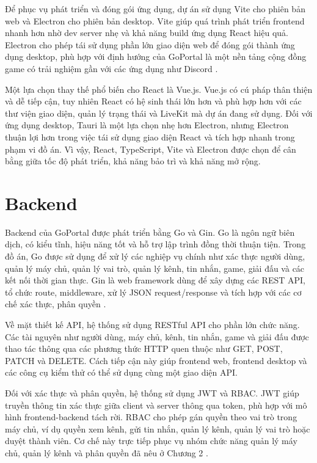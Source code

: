 Để phục vụ phát triển và đóng gói ứng dụng, dự án sử dụng Vite cho phiên bản web và Electron cho phiên bản desktop. Vite giúp quá trình phát triển frontend nhanh hơn nhờ dev server nhẹ và khả năng build ứng dụng React hiệu quả. Electron cho phép tái sử dụng phần lớn giao diện web để đóng gói thành ứng dụng desktop, phù hợp với định hướng của GoPortal là một nền tảng cộng đồng game có trải nghiệm gần với các ứng dụng như Discord \cite{vite-docs,electron-docs}.

Một lựa chọn thay thế phổ biến cho React là Vue.js. Vue.js có cú pháp thân thiện và dễ tiếp cận, tuy nhiên React có hệ sinh thái lớn hơn và phù hợp hơn với các thư viện giao diện, quản lý trạng thái và LiveKit mà dự án đang sử dụng. Đối với ứng dụng desktop, Tauri là một lựa chọn nhẹ hơn Electron, nhưng Electron thuận lợi hơn trong việc tái sử dụng giao diện React và tích hợp nhanh trong phạm vi đồ án. Vì vậy, React, TypeScript, Vite và Electron được chọn để cân bằng giữa tốc độ phát triển, khả năng bảo trì và khả năng mở rộng.

\section{Backend}
\label{section:3.3}

Backend của GoPortal được phát triển bằng Go và Gin. Go là ngôn ngữ biên dịch, có kiểu tĩnh, hiệu năng tốt và hỗ trợ lập trình đồng thời thuận tiện. Trong đồ án, Go được sử dụng để xử lý các nghiệp vụ chính như xác thực người dùng, quản lý máy chủ, quản lý vai trò, quản lý kênh, tin nhắn, game, giải đấu và các kết nối thời gian thực. Gin là web framework dùng để xây dựng các REST API, tổ chức route, middleware, xử lý JSON request/response và tích hợp với các cơ chế xác thực, phân quyền \cite{go-docs,gin-docs}.

Về mặt thiết kế API, hệ thống sử dụng RESTful API cho phần lớn chức năng. Các tài nguyên như người dùng, máy chủ, kênh, tin nhắn, game và giải đấu được thao tác thông qua các phương thức HTTP quen thuộc như GET, POST, PATCH và DELETE. Cách tiếp cận này giúp frontend web, frontend desktop và các công cụ kiểm thử có thể sử dụng cùng một giao diện API.

Đối với xác thực và phân quyền, hệ thống sử dụng JWT và RBAC. JWT giúp truyền thông tin xác thực giữa client và server thông qua token, phù hợp với mô hình frontend-backend tách rời. RBAC cho phép gán quyền theo vai trò trong máy chủ, ví dụ quyền xem kênh, gửi tin nhắn, quản lý kênh, quản lý vai trò hoặc duyệt thành viên. Cơ chế này trực tiếp phục vụ nhóm chức năng quản lý máy chủ, quản lý kênh và phân quyền đã nêu ở Chương 2 \cite{jwt-rfc7519}.

